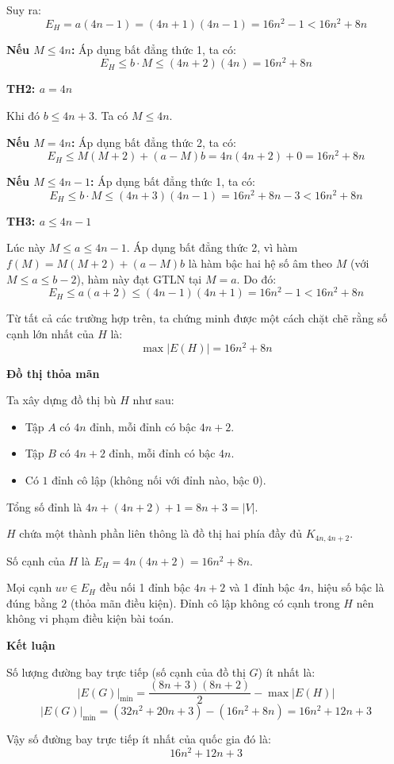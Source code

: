 \documentclass[12pt,a4paper]{article}
\theoremstyle{definition}
\begin{document}
Suy ra:
\[
E_H = a(4n-1) = (4n+1)(4n-1) = 16n^2 - 1 < 16n^2 + 8n
\]

\textbf{Nếu $M \le 4n$:} Áp dụng bất đẳng thức 1, ta có:
\[
E_H \le b \cdot M \le (4n+2)(4n) = 16n^2 + 8n
\]

\textbf{TH2: $a = 4n$}

Khi đó $b \le 4n+3$. Ta có $M \le 4n$.

\textbf{Nếu $M = 4n$:} Áp dụng bất đẳng thức 2, ta có:
\[
E_H \le M(M+2) + (a-M)b = 4n(4n+2) + 0 = 16n^2 + 8n
\]

\textbf{Nếu $M \le 4n-1$:} Áp dụng bất đẳng thức 1, ta có:
\[
E_H \le b \cdot M \le (4n+3)(4n-1) = 16n^2 + 8n - 3 < 16n^2 + 8n
\]

\textbf{TH3: $a \le 4n-1$}

Lúc này $M \le a \le 4n-1$. Áp dụng bất đẳng thức 2, vì hàm $f(M) = M(M+2) + (a-M)b$ là hàm bậc hai hệ số âm theo $M$ (với $M \le a \le b-2$), hàm này đạt GTLN tại $M = a$. Do đó:
\[
E_H \le a(a+2) \le (4n-1)(4n+1) = 16n^2 - 1 < 16n^2 + 8n
\]

Từ tất cả các trường hợp trên, ta chứng minh được một cách chặt chẽ rằng số cạnh lớn nhất của $H$ là:
\[
\max |E(H)| = 16n^2 + 8n
\]

\textbf{Đồ thị thỏa mãn}

Ta xây dựng đồ thị bù $H$ như sau:
\begin{itemize}
    \item[$+$] Tập $A$ có $4n$ đỉnh, mỗi đỉnh có bậc $4n+2$.
    \item[$+$] Tập $B$ có $4n+2$ đỉnh, mỗi đỉnh có bậc $4n$.
    \item[$+$] Có $1$ đỉnh cô lập (không nối với đỉnh nào, bậc $0$).
\end{itemize}

Tổng số đỉnh là $4n + (4n+2) + 1 = 8n + 3 = |V|$.

$H$ chứa một thành phần liên thông là đồ thị hai phía đầy đủ $K_{4n, 4n+2}$.

Số cạnh của $H$ là $E_H = 4n(4n+2) = 16n^2 + 8n$.

Mọi cạnh $uv \in E_H$ đều nối 1 đỉnh bậc $4n+2$ và 1 đỉnh bậc $4n$, hiệu số bậc là đúng bằng $2$ (thỏa mãn điều kiện). Đỉnh cô lập không có cạnh trong $H$ nên không vi phạm điều kiện bài toán.

\textbf{Kết luận}

Số lượng đường bay trực tiếp (số cạnh của đồ thị $G$) ít nhất là:
\[
|E(G)|_{\min} = \frac{(8n+3)(8n+2)}{2} - \max |E(H)|
\]
\[
|E(G)|_{\min} = (32n^2 + 20n + 3) - (16n^2 + 8n) = 16n^2 + 12n + 3
\]

Vậy số đường bay trực tiếp ít nhất của quốc gia đó là:
\[
\boxed{16n^2 + 12n + 3}
\]
\end{document}
